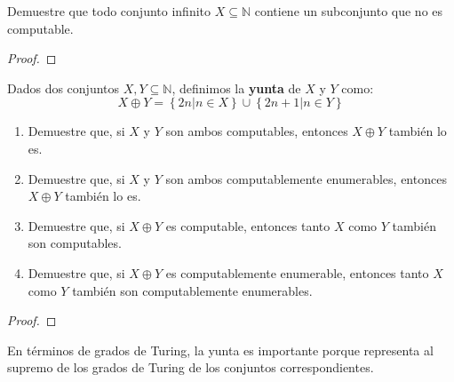 \documentclass[12pt]{report}
\newcounter{it}
\theoremstyle{largebreak}
\begin{document}
    \begin{excer}
        Demuestre que todo conjunto infinito $X\subseteq\mathbb{N}$ contiene un subconjunto que no es computable.
    \end{excer}
    
    \begin{proof}
        
    \end{proof}

    \begin{excer}
        Dados dos conjuntos $X,Y\subseteq\mathbb{N}$, definimos la \textbf{yunta} de $X$ y $Y$ como:
        \begin{equation*}
            X\oplus Y=\left\{2n\Big|n\in X \right\}\cup\left\{2n+1\Big|n\in Y \right\}
        \end{equation*}
        \begin{enumerate}[label = \textit{(\alph*)}]
            \item Demuestre que, si $X$ y $Y$ son ambos computables, entonces $X\oplus Y$ también lo es.
            \item Demuestre que, si $X$ y $Y$ son ambos computablemente enumerables, entonces $X\oplus Y$ también lo es.
            \item Demuestre que, si $X\oplus Y$ es computable, entonces tanto $X$ como $Y$ también son computables.
            \item Demuestre que, si $X\oplus Y$ es computablemente enumerable, entonces tanto $X$ como $Y$ también son computablemente enumerables.
        \end{enumerate}
    \end{excer}

    \begin{proof}
        
    \end{proof}

    \begin{obs}
        En términos de grados de Turing, la yunta es importante porque representa al supremo de los grados de Turing de los conjuntos correspondientes.
    \end{obs}
\end{document}
